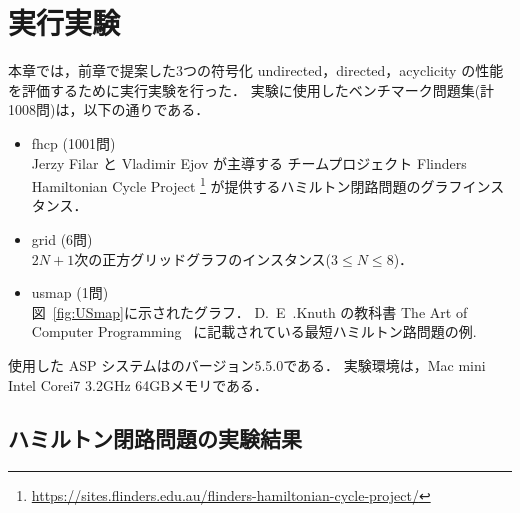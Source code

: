 ﻿%
\section{実行実験}\label{chap:experiment}

本章では，前章で提案した3つの符号化
\textsf{undirected}，\textsf{directed}，\textsf{acyclicity}
の性能を評価するために実行実験を行った．
%
実験に使用したベンチマーク問題集(計1008問)は，以下の通りである．
\begin{itemize}
\item \textsf{fhcp} (1001問)\\
  Jerzy Filar と Vladimir Ejov が主導する
  チームプロジェクト Flinders Hamiltonian Cycle Project
  \footnote{\url{https://sites.flinders.edu.au/flinders-hamiltonian-cycle-project/}}
  が提供するハミルトン閉路問題のグラフインスタンス．\cite{haythorpe19:fhcp}
\item \textsf{grid} (6問)\\
  $2N+1$次の正方グリッドグラフのインスタンス($3\leq N\leq 8$)．
\item \textsf{usmap} (1問)\\
  図~\ref{fig:USmap}に示されたグラフ．
  D.~E~.Knuth の教科書
  The Art of Computer Programming~\cite{Knuth:TAOCP:SAT}
  に記載されている最短ハミルトン路問題の例.
\end{itemize}

使用した ASP システムは{\clingo}のバージョン5.5.0である．
実験環境は，Mac mini Intel Corei7 3.2GHz 64GBメモリである．

\subsection{ハミルトン閉路問題の実験結果}


